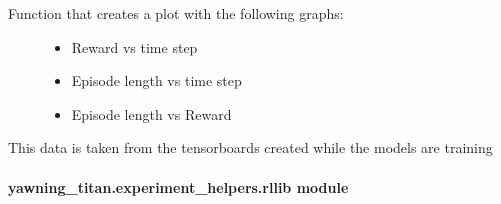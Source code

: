 \documentclass[letterpaper,10pt,english]{sphinxmanual}
\begin{document}
\begin{fulllineitems}
\label{\detokenize{source/yawning_titan.experiment_helpers:yawning_titan.experiment_helpers.model_evaluation.show_training_data}}\begin{description}
\item[{Function that creates a plot with the following graphs:}] \leavevmode\begin{itemize}
\item {}
\sphinxAtStartPar
Reward vs time step

\item {}
\sphinxAtStartPar
Episode length vs time step

\item {}
\sphinxAtStartPar
Episode length vs Reward

\end{itemize}

\end{description}

\sphinxAtStartPar
This data is taken from the tensorboards created while the models are training

\end{fulllineitems}



\paragraph{yawning\_titan.experiment\_helpers.rllib module}
\label{\detokenize{source/yawning_titan.experiment_helpers:module-yawning_titan.experiment_helpers.rllib}}\label{\detokenize{source/yawning_titan.experiment_helpers:yawning-titan-experiment-helpers-rllib-module}}

\begin{fulllineitems}
\label{\detokenize{source/yawning_titan.experiment_helpers:yawning_titan.experiment_helpers.rllib.env_creator}}
\end{fulllineitems}
\end{document}
